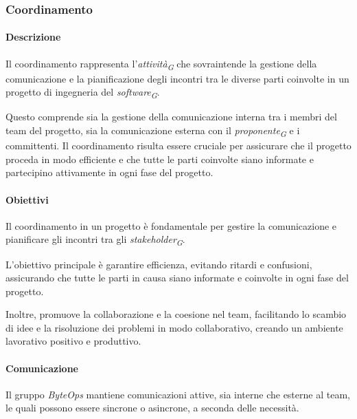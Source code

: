 \subsubsection{Coordinamento}

\paragraph{Descrizione}
Il coordinamento rappresenta l'\textit{attività}\textsubscript{\textit{G}} che sovraintende la gestione della comunicazione e la pianificazione degli incontri tra le diverse parti coinvolte in un progetto di ingegneria del \textit{software}\textsubscript{\textit{G}}.

Questo comprende sia la gestione della comunicazione interna tra i membri del team del progetto, sia la comunicazione esterna con il \textit{proponente}\textsubscript{\textit{G}} e i committenti. Il coordinamento risulta essere cruciale per assicurare che il progetto proceda in modo efficiente e che tutte le parti coinvolte siano informate e partecipino attivamente in ogni fase del progetto.

\paragraph{Obiettivi}
Il coordinamento in un progetto è fondamentale per gestire la comunicazione e pianificare gli incontri tra gli \textit{stakeholder}\textsubscript{\textit{G}}.

L'obiettivo principale è garantire efficienza, evitando ritardi e confusioni, assicurando che tutte le parti in causa siano informate e coinvolte in ogni fase del progetto.

Inoltre, promuove la collaborazione e la coesione nel team, facilitando lo scambio di idee e la risoluzione dei problemi in modo collaborativo, creando un ambiente lavorativo positivo e produttivo.

\paragraph*{Comunicazione}
Il gruppo \textit{ByteOps} mantiene comunicazioni attive, sia interne che esterne al team, le quali possono essere sincrone o asincrone, a seconda delle necessità.


